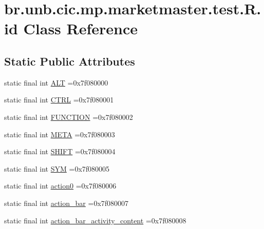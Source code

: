 \hypertarget{classbr_1_1unb_1_1cic_1_1mp_1_1marketmaster_1_1test_1_1R_1_1id}{}\section{br.\+unb.\+cic.\+mp.\+marketmaster.\+test.\+R.\+id Class Reference}
\label{classbr_1_1unb_1_1cic_1_1mp_1_1marketmaster_1_1test_1_1R_1_1id}
\subsection*{Static Public Attributes}
\begin{DoxyCompactItemize}
\item 
static final int \mbox{\hyperlink{classbr_1_1unb_1_1cic_1_1mp_1_1marketmaster_1_1test_1_1R_1_1id_aae14771653bcbf2c478f422224ceac5d}{A\+LT}} =0x7f080000
\item 
static final int \mbox{\hyperlink{classbr_1_1unb_1_1cic_1_1mp_1_1marketmaster_1_1test_1_1R_1_1id_a33885387a1221cebfa8c7772b95e7e01}{C\+T\+RL}} =0x7f080001
\item 
static final int \mbox{\hyperlink{classbr_1_1unb_1_1cic_1_1mp_1_1marketmaster_1_1test_1_1R_1_1id_a031d30e721afbd2e232c4061c268aff4}{F\+U\+N\+C\+T\+I\+ON}} =0x7f080002
\item 
static final int \mbox{\hyperlink{classbr_1_1unb_1_1cic_1_1mp_1_1marketmaster_1_1test_1_1R_1_1id_ab10ab230eb5dc8b42204a1e88fe579cc}{M\+E\+TA}} =0x7f080003
\item 
static final int \mbox{\hyperlink{classbr_1_1unb_1_1cic_1_1mp_1_1marketmaster_1_1test_1_1R_1_1id_acdc833ef4e6a1dda0c087edd6fe227ca}{S\+H\+I\+FT}} =0x7f080004
\item 
static final int \mbox{\hyperlink{classbr_1_1unb_1_1cic_1_1mp_1_1marketmaster_1_1test_1_1R_1_1id_a2a09b3408d454055de79f7b2fefd069d}{S\+YM}} =0x7f080005
\item 
static final int \mbox{\hyperlink{classbr_1_1unb_1_1cic_1_1mp_1_1marketmaster_1_1test_1_1R_1_1id_a155d54358233171c1bb2a0b922a9e8ec}{action0}} =0x7f080006
\item 
static final int \mbox{\hyperlink{classbr_1_1unb_1_1cic_1_1mp_1_1marketmaster_1_1test_1_1R_1_1id_a1ccaed5c51d395d4b16a983ac65fdafc}{action\+\_\+bar}} =0x7f080007
\item 
static final int \mbox{\hyperlink{classbr_1_1unb_1_1cic_1_1mp_1_1marketmaster_1_1test_1_1R_1_1id_a283dc1441e60e27476a7d06a51d55c49}{action\+\_\+bar\+\_\+activity\+\_\+content}} =0x7f080008

\end{DoxyCompactItemize}
